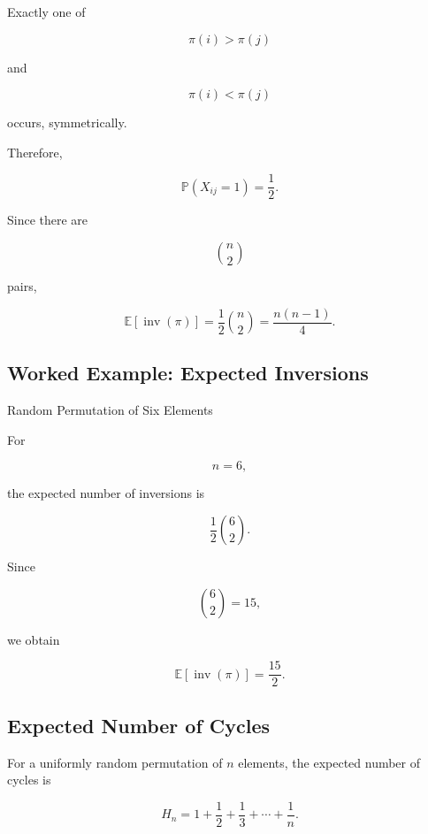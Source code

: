 Exactly one of

\[
\pi(i)>\pi(j)
\]

and

\[
\pi(i)<\pi(j)
\]

occurs, symmetrically.

Therefore,

\[
\mathbb{P}(X_{ij}=1)
=
\frac12.
\]

Since there are

\[
\binom n2
\]

pairs,

\[
\boxed{
\mathbb{E}[\operatorname{inv}(\pi)]
=
\frac12\binom n2
=
\frac{n(n-1)}4.
}
\]

\subsection{Worked Example: Expected Inversions}
\label{subsec:worked-expected-inversions}

\begin{workedexamplebox}{Random Permutation of Six Elements}

For

\[
n=6,
\]

the expected number of inversions is

\[
\frac12\binom62.
\]

Since

\[
\binom62=15,
\]

we obtain

\begin{answerbox}
\[
\boxed{
\mathbb{E}[\operatorname{inv}(\pi)]
=
\frac{15}{2}.
}
\]
\end{answerbox}

\end{workedexamplebox}

\subsection{Expected Number of Cycles}
\label{subsec:expected-cycles-random-permutation}

For a uniformly random permutation of \(n\) elements, the expected
number of cycles is

\[
\boxed{
H_n
=
1+\frac12+\frac13+\cdots+\frac1n.
}
\]

